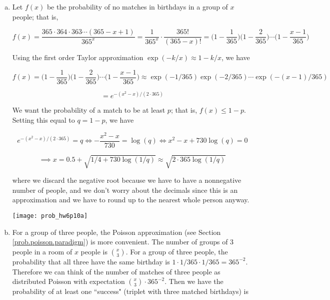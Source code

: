 \begin{enumerate}[(a)]

\item Let \(f(x)\) be the probability of no matches in birthdays in a group of \(x\) people; that is, 

\[
f(x) = \frac{365 \cdot 364 \cdot 363 \cdots (365 - x + 1)}{365^x} = \frac{1}{365^x} \cdot \frac{365!}{(365 - x)!} = \bigg( 1 - \frac{1}{365} \bigg) \bigg(1 - \frac{2}{365} \bigg) \cdots \bigg( 1 - \frac{x-1}{365}\bigg) 
\]

Using the first order Taylor approximation \(\exp(-k/x) \approx 1 - k/x\), we have

\[
f(x) = \bigg( 1 - \frac{1}{365} \bigg) \bigg(1 - \frac{2}{365} \bigg) \cdots \bigg( 1 - \frac{x-1}{365}\bigg)  \approx \exp(-1/365) \exp(-2/365) \cdots \exp(-(x-1)/365) 
\]

\[
= e^{-(x^2 - x)/(2\cdot 365)}
\]

We want the probability of a match to be at least \(p\); that is, \(f(x) \leq 1 - p\). Setting this equal to \(q = 1 - p\), we have

\[
e^{-(x^2 - x)/(2\cdot 365)} = q \iff -\frac{x^2 - x}{730} = \log(q) \iff x^2 - x + 730 \log(q) = 0 
\]

\[
\implies x = 0.5 + \sqrt{1/4 + 730 \log(1/q)} \approx \boxed{ \sqrt{2 \cdot 365 \log(1/q)}}
\]

where we discard the negative root because we have to have a nonnegative number of people, and we don't worry about the decimals since this is an approximation and we have to round up to the nearest whole person anyway.

\texttt{[image: prob\_hw6p10a]}

%
%



\item For a group of three people, the Poisson approximation (see Section \ref{prob.poisson.paradigm}) is more convenient. The number of groups of 3 people in a room of \(x\) people is \(\binom{x}{3}\). For a group of three people, the probability that all three have the same birthday is \(1 \cdot 1/365 \cdot 1/365 = 365^{-2}\). Therefore we can think of the number of matches of three people as distributed Poisson with expectation \(\binom{x}{3} \cdot 365^{-2}\). Then we have the probability of at least one ``success" (triplet with three matched birthdays) is


\end{enumerate}
